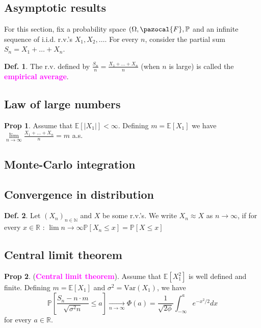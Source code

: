 \documentclass[8pt,a4paper,landscape]{article}
\theoremstyle{definition}
\newtheorem{definition}{Def.}[section]
\theoremstyle{example}
\theoremstyle{intuition}
\theoremstyle{definition}
\newtheorem{proposition}{Prop}[section]
\newcommand{\Fb}{\pazocal{F}}
\newcommand{\mydef}[1]{\textcolor{magenta}{\textbf{#1}}}
\newcommand{\prob}[1]{\mathbb{P}\left[ #1 \right]}
\newcommand{\expec}[1]{\mathbb{E}\left[ #1 \right]}
\begin{document}
\begin{multicols}{3}
	\section{Asymptotic results}
		For this section, fix a probability space $(\Omega, \Fb, \mathbb{P}$ and an infinite sequence of i.i.d. r.v.'s $X_1, X_2, \ldots$. For every $n$, consider the partial sum $S_n = X_1 + \ldots + X_n$.
		\begin{definition}
			The r.v. defined by $\frac{S_n}{n} = \frac{X_1 + \ldots + X_n}{n}$ (when $n$ is large) is called the \mydef{empirical average}.
		\end{definition}


		\subsection{Law of large numbers}
			\begin{proposition}
				Assume that $\expec{\lvert X_1 \lvert} < \infty$. Defining $m = \expec{X_1}$ we have 
				$
					\lim\limits_{n \to \infty} \frac{X_1 + \ldots + X_n}{n} = m
				$ a.s.
			\end{proposition}


		\subsection{Monte-Carlo integration}


		\subsection{Convergence in distribution}
			\begin{definition}
				Let $(X_n)_{n \in \mathbb{N}}$ and $X$ be some r.v.'s. We write $X_n \approx X$ as $n \to \infty$, if for every $x \in \mathbb{R}$ : $\lim\limits{n \to \infty} \prob{X_n \leq x} = \prob{X \leq x}$
			\end{definition}

		
		\subsection{Central limit theorem}
			\begin{proposition}
				(\mydef{Central limit theorem}).
			Assume that $\expec{X_1^2}$ is well defined and finite. Defining $m = \expec{X_1}$ and $\sigma^2 = \text{Var}(X_1)$, we have 
				$$
				\prob{\frac{S_n - n\cdot m}{\sqrt{\sigma^2 n}} \leq a} \underset{n \to \infty}{\longrightarrow} \Phi(a) = \frac{1}{\sqrt{2\phi}} \int_{-\infty}^a e^{-x^2 / 2} dx
				$$
				for every $a \in \mathbb{R}$.
			\end{proposition}



	
\end{multicols}	
\end{document}

